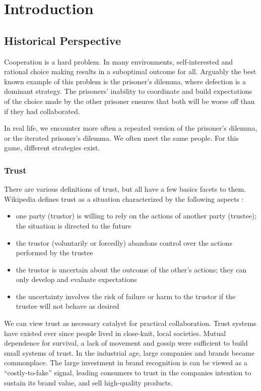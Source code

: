 \chapter{Introduction}
\section{Historical Perspective}
Cooperation is a hard problem. 
In many environments, self-interested and rational choice making results in a suboptimal outcome for all. 
Arguably the best known example of this problem is the prisoner's dilemma, 
where defection is a dominant strategy. 
The prisoners' inability to coordinate and build expectations of the choice made by the other prisoner ensures that both will be worse off than if they had collaborated.

In real life, we encounter more often a repeated version of the prisoner's dilemma, or the iterated prisoner's dilemma. 
We often meet the same people. 
For this game, different strategies exist. 

\subsection{Trust}
There are various definitions of trust, 
but all have a few basics facets to them. 
Wikipedia defines trust as a situation characterized by the following aspects \cite{wikipedia_trust}:
\begin{itemize}
	\item one party (trustor) is willing to rely on the actions of another party (trustee); 
	the situation is directed to the future
	\item the trustor (voluntarily or forcedly) abandons control over the actions performed by the trustee
	\item the trustor is uncertain about the outcome of the other's actions; 
	they can only develop and evaluate expectations
	\item the uncertainty involves the risk of failure or harm to the trustor if the trustee will not behave as desired
\end{itemize}
We can view trust as necessary catalyst for practical collaboration.
Trust systems have existed ever since people lived in close-knit, local societies. Mutual dependence for survival, a lack of movement and gossip were sufficient to build small systems of trust.
In the industrial age, large companies and brands became commonplace.
The large investment in brand recognition is can be viewed as a ``costly-to-fake'' signal, leading consumers to trust in the companies intention to sustain its brand value, and sell high-quality products.


